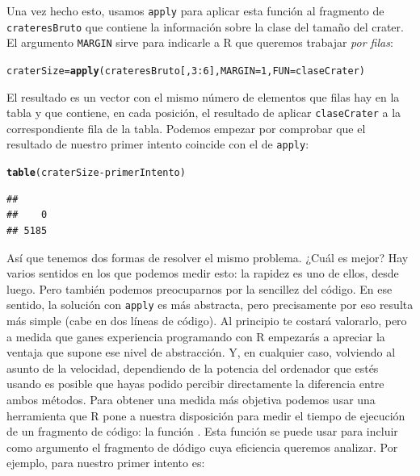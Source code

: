 \documentclass[10pt,a4paper]{article}\usepackage[]{graphicx}\usepackage[]{color}
\makeatletter
\newcommand{\hlnum}[1]{\textcolor[rgb]{0.686,0.059,0.569}{#1}}%
\newcommand{\hlopt}[1]{\textcolor[rgb]{0,0,0}{#1}}%
\newcommand{\hlstd}[1]{\textcolor[rgb]{0.345,0.345,0.345}{#1}}%
\newcommand{\hlkwb}[1]{\textcolor[rgb]{0.69,0.353,0.396}{#1}}%
\newcommand{\hlkwc}[1]{\textcolor[rgb]{0.333,0.667,0.333}{#1}}%
\newcommand{\hlkwd}[1]{\textcolor[rgb]{0.737,0.353,0.396}{\textbf{#1}}}%
\newenvironment{kframe}{%
 \def\at@end@of@kframe{}%
 \ifinner\ifhmode%
  \def\at@end@of@kframe{\end{minipage}}%
  \begin{minipage}{\columnwidth}%
 \fi\fi%
 \def\FrameCommand##1{\hskip\@totalleftmargin \hskip-\fboxsep
 \colorbox{shadecolor}{##1}\hskip-\fboxsep
     \hskip-\linewidth \hskip-\@totalleftmargin \hskip\columnwidth}%
 \MakeFramed {\advance\hsize-\width
   \@totalleftmargin\z@ \linewidth\hsize
   \@setminipage}}%
 {\par\unskip\endMakeFramed%
 \at@end@of@kframe}
\newenvironment{knitrout}{}{} %
\newcounter {cont01}
\makeatother
\begin{document}
Una vez hecho esto, usamos {\tt apply} para aplicar esta función al fragmento de {\tt crateresBruto} que contiene la información sobre la clase del tamaño del crater. El argumento {\tt MARGIN} sirve para indicarle a R que queremos trabajar {\em por filas}:
\begin{knitrout}
\color{fgcolor}\begin{kframe}
\begin{alltt}
\hlstd{craterSize} \hlkwb{=} \hlkwd{apply}\hlstd{(crateresBruto[,} \hlnum{3}\hlopt{:}\hlnum{6}\hlstd{],} \hlkwc{MARGIN} \hlstd{=} \hlnum{1}\hlstd{,} \hlkwc{FUN} \hlstd{= claseCrater)}
\end{alltt}
\end{kframe}
\end{knitrout}
El resultado es un vector con el mismo número de elementos que filas hay en la tabla y que contiene, en cada posición, el resultado de aplicar  {\tt claseCrater} a la correspondiente fila de la tabla. Podemos empezar por comprobar que el resultado de nuestro primer intento coincide con el de {\tt apply}:
\begin{knitrout}
\color{fgcolor}\begin{kframe}
\begin{alltt}
\hlkwd{table}\hlstd{(craterSize} \hlopt{-} \hlstd{primerIntento)}
\end{alltt}
\begin{verbatim}
## 
##    0 
## 5185
\end{verbatim}
\end{kframe}
\end{knitrout}
Así que tenemos dos formas de resolver el mismo problema. ¿Cuál es mejor? Hay varios sentidos en los que podemos medir esto: la rapidez es uno de ellos, desde luego. Pero también podemos preocuparnos por la sencillez del código. En ese sentido, la solución con {\tt apply} es más abstracta, pero precisamente por eso resulta más simple (cabe en dos líneas de código). Al principio te costará valorarlo, pero a medida que ganes experiencia programando con R empezarás a apreciar la ventaja que supone ese nivel de abstracción. Y, en cualquier caso, volviendo al asunto de la velocidad, dependiendo de la potencia del ordenador que estés usando  es posible que  hayas podido percibir directamente la diferencia entre ambos métodos. Para obtener una medida más objetiva podemos usar una herramienta que R pone a nuestra disposición para medir el tiempo de ejecución de un fragmento de código: la función {\tt }. Esta función se puede usar para incluir como argumento el fragmento de dódigo cuya eficiencia queremos analizar. Por ejemplo, para nuestro primer intento es:
\end{document}
